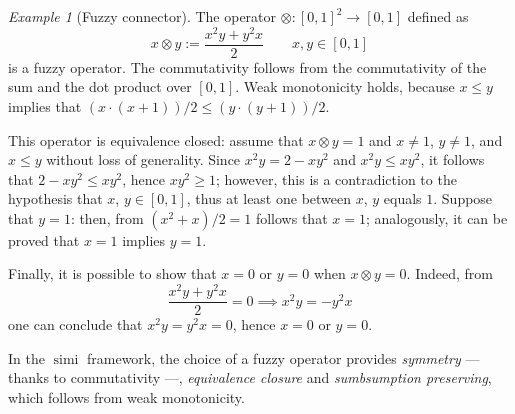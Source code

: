 \documentclass[]{llncs}
\DeclareMathOperator{\simi}{simi}
\theoremstyle{remark}
\newtheorem{exa}{Example}
\begin{document}
  \begin{exa}[Fuzzy connector]
    The operator \(\otimes \colon {[0,1]}^2 \to [0,1]\) defined as
    \[
    x \otimes y := \frac{x^2y + y^2x}{2} \qquad x,y \in [0,1]
    \]
    is a fuzzy operator.
    The commutativity follows from the commutativity of the sum and the dot product over \([0,1]\). Weak monotonicity holds, because \(x \le y\) implies that \((x \cdot (x+1))/2 \le (y \cdot (y+1))/2\).

    This operator is equivalence closed: assume that \(x \otimes y = 1\) and \(x \ne 1\), \(y \ne 1\), and \(x \le y\) without loss of generality.
    Since \(x^2y = 2 - xy^2\) and \(x^2y \le xy^2\), it follows that \(2-xy^2 \le xy^2\), hence \(xy^2 \ge 1\); however, this is a contradiction to the hypothesis that \(x\), \(y \in [0,1]\), thus at least one between \(x\), \(y\) equals \(1\).
    Suppose that \(y = 1\): then, from \((x^2 + x)/2 = 1\) follows that \(x = 1\); analogously, it can be proved that \(x = 1\) implies \(y = 1\).

    Finally, it is possible to show that \(x = 0\) or \(y = 0\) when \(x \otimes y = 0\).
    Indeed, from
    \[
    \frac{x^2y + y^2x}{2} = 0 \implies x^2y = - y^2x
    \]
    one can conclude that \(x^2y = y^2x = 0\), hence \(x = 0\) or \(y = 0\).
  \end{exa}
  In the \(\simi{}\) framework, the choice of a fuzzy operator provides \emph{symmetry} --- thanks to commutativity ---, \emph{equivalence closure} and \emph{sumbsumption preserving}, which follows from weak monotonicity.
\end{document}
